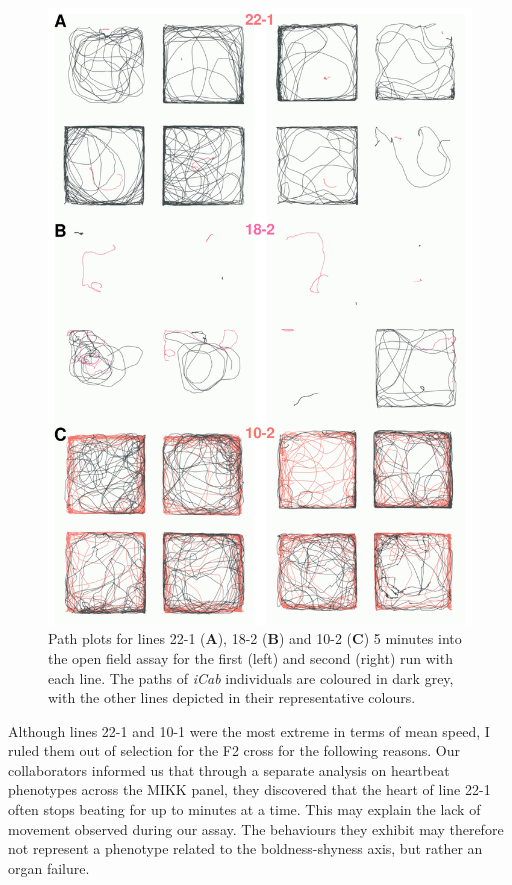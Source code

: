 \documentclass[
]{book}
\begin{document}
\begin{figure}
\includegraphics[width=1\linewidth]{figs/mikk_behaviour/path_plot_22-1_18-2_10-1_300} \caption{Path plots for lines 22-1 (\textbf{A}), 18-2 (\textbf{B}) and 10-2 (\textbf{C}) 5 minutes into the open field assay for the first (left) and second (right) run with each line. The paths of \emph{\textcolor{iCab_424B4D}{iCab}} individuals are coloured in dark grey, with the other lines depicted in their representative colours.}\label{fig:extreme-paths}
\end{figure}

Although lines \textcolor{22-1_FB737A}{22-1} and \textcolor{10-1_F8766D}{10-1} were the most extreme in terms of mean speed, I ruled them out of selection for the F2 cross for the following reasons. Our collaborators informed us that through a separate analysis on heartbeat phenotypes across the MIKK panel, they discovered that the heart of line \textcolor{22-1_FB737A}{22-1} often stops beating for up to minutes at a time. This may explain the lack of movement observed during our assay. The behaviours they exhibit may therefore not represent a phenotype related to the boldness-shyness axis, but rather an organ failure.
\end{document}
